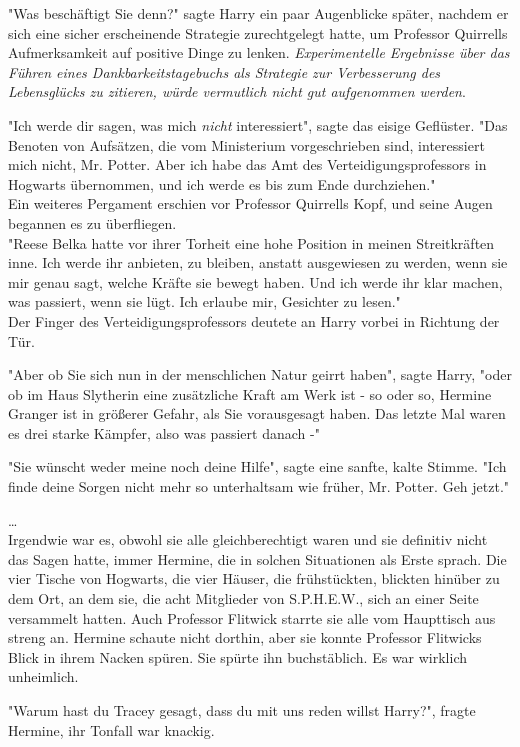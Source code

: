 {"Was beschäftigt Sie denn?" sagte Harry ein paar Augenblicke später, nachdem er sich eine sicher erscheinende Strategie zurechtgelegt hatte, um Professor Quirrells Aufmerksamkeit auf positive Dinge zu lenken. \emph{Experimentelle Ergebnisse über das Führen eines Dankbarkeitstagebuchs als Strategie zur Verbesserung des Lebensglücks zu zitieren, würde vermutlich nicht gut aufgenommen werden}.

"Ich werde dir sagen, was mich \emph{nicht} interessiert", sagte das eisige Geflüster. "Das Benoten von Aufsätzen, die vom Ministerium vorgeschrieben sind, interessiert mich nicht, Mr. Potter. Aber ich habe das Amt des Verteidigungsprofessors in Hogwarts übernommen, und ich werde es bis zum Ende durchziehen."\\ Ein weiteres Pergament erschien vor Professor Quirrells Kopf, und seine Augen begannen es zu überfliegen.\\ "Reese Belka hatte vor ihrer Torheit eine hohe Position in meinen Streitkräften inne. Ich werde ihr anbieten, zu bleiben, anstatt ausgewiesen zu werden, wenn sie mir genau sagt, welche Kräfte sie bewegt haben. Und ich werde ihr klar machen, was passiert, wenn sie lügt. Ich erlaube mir, Gesichter zu lesen."\\ Der Finger des Verteidigungsprofessors deutete an Harry vorbei in Richtung der Tür.

"Aber ob Sie sich nun in der menschlichen Natur geirrt haben", sagte Harry, "oder ob im Haus Slytherin eine zusätzliche Kraft am Werk ist - so oder so, Hermine Granger ist in größerer Gefahr, als Sie vorausgesagt haben. Das letzte Mal waren es drei starke Kämpfer, also was passiert danach -"

"Sie wünscht weder meine noch deine Hilfe", sagte eine sanfte, kalte Stimme. "Ich finde deine Sorgen nicht mehr so unterhaltsam wie früher, Mr. Potter. Geh jetzt."

…\\ Irgendwie war es, obwohl sie alle gleichberechtigt waren und sie definitiv nicht das Sagen hatte, immer Hermine, die in solchen Situationen als Erste sprach. Die vier Tische von Hogwarts, die vier Häuser, die frühstückten, blickten hinüber zu dem Ort, an dem sie, die acht Mitglieder von S.P.H.E.W., sich an einer Seite versammelt hatten. Auch Professor Flitwick starrte sie alle vom Haupttisch aus streng an. Hermine schaute nicht dorthin, aber sie konnte Professor Flitwicks Blick in ihrem Nacken spüren. Sie spürte ihn buchstäblich. Es war wirklich unheimlich.

"Warum hast du Tracey gesagt, dass du mit uns reden willst Harry?", fragte Hermine, ihr Tonfall war knackig.

}
